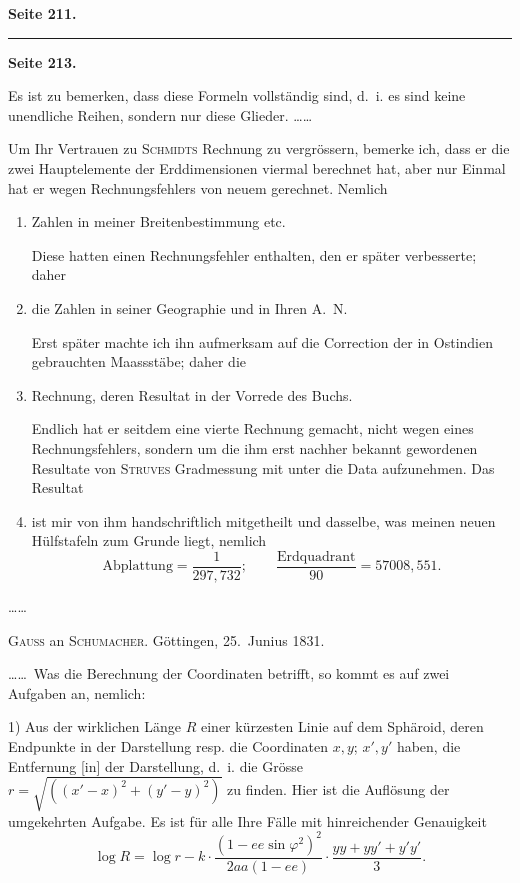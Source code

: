 \documentclass[12pt,a4paper]{article}
\theoremstyle{plain}
\theoremstyle{definition}
\theoremstyle{remark}
\begin{document}
\newpage
\textbf{Seite 211.}

\medskip
\hrule
\medskip

\textbf{Seite 213.}

Es ist zu bemerken, dass diese Formeln vollständig sind, d.~i. es sind keine unendliche Reihen, sondern nur diese Glieder. \ldots\ldots

Um Ihr Vertrauen zu \textsc{Schmidts} Rechnung zu vergrössern, bemerke ich, dass er die zwei Hauptelemente der Erddimensionen viermal berechnet hat, aber nur Einmal hat er wegen Rechnungsfehlers von neuem gerechnet. Nemlich
\begin{enumerate}[label=\arabic*)]
\item Zahlen in meiner Breitenbestimmung etc.

Diese hatten einen Rechnungsfehler enthalten, den er später verbesserte; daher

\item die Zahlen in seiner Geographie und in Ihren A.~N.

Erst später machte ich ihn aufmerksam auf die Correction der in Ostindien gebrauchten Maassstäbe; daher die

\item Rechnung, deren Resultat in der Vorrede des Buchs.

Endlich hat er seitdem eine vierte Rechnung gemacht, nicht wegen eines Rechnungsfehlers, sondern um die ihm erst nachher bekannt gewordenen Resultate von \textsc{Struves} Gradmessung mit unter die Data aufzunehmen. Das Resultat

\item ist mir von ihm handschriftlich mitgetheilt und dasselbe, was meinen neuen Hülfstafeln zum Grunde liegt, nemlich
\[
\text{Abplattung} = \frac{1}{297{,}732}; \qquad \frac{\text{Erdquadrant}}{90} = 57008{,}551.
\]
\end{enumerate}

\ldots\ldots

\medskip
\textsc{Gauß} an \textsc{Schumacher}. Göttingen, 25.~Junius 1831.

\ldots\ldots\ Was die Berechnung der Coordinaten betrifft, so kommt es auf zwei Aufgaben an, nemlich:

1) Aus der wirklichen Länge $R$ einer kürzesten Linie auf dem Sphäroid, deren Endpunkte in der Darstellung resp. die Coordinaten $x, y$; $x', y'$ haben, die Entfernung [in] der Darstellung, d.~i. die Grösse $r = \sqrt{((x' - x)^2 + (y' - y)^2)}$ zu finden. Hier ist die Auflösung der umgekehrten Aufgabe. Es ist für alle Ihre Fälle mit hinreichender Genauigkeit
\[
\log R = \log r - k \cdot \frac{(1 - ee \sin \varphi^2)^2}{2aa(1 - ee)} \cdot \frac{yy + yy' + y'y'}{3}.
\]
\end{document}
